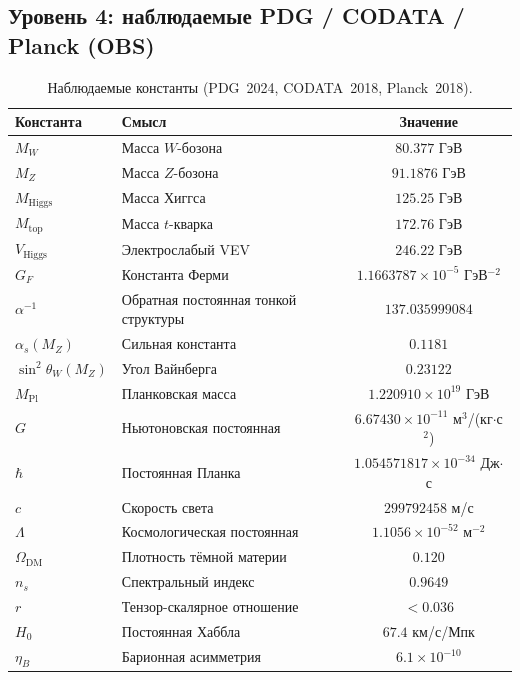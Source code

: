 \documentclass[11pt,a4paper]{article}
\theoremstyle{definition}
\begin{document}
\subsection{Уровень 4: наблюдаемые PDG / CODATA / Planck (OBS)}
\label{app:level-4-obs}

\begin{table}[ht]
\centering
\caption{Наблюдаемые константы (PDG~2024, CODATA~2018, Planck~2018).}
\label{tab:app-obs}
\begin{tabular}{llc}
\toprule
Константа & Смысл & Значение \\
\midrule
$M_W$ & Масса $W$-бозона & $80.377$ ГэВ \\
$M_Z$ & Масса $Z$-бозона & $91.1876$ ГэВ \\
$M_{\text{Higgs}}$ & Масса Хиггса & $125.25$ ГэВ \\
$M_{\text{top}}$ & Масса $t$-кварка & $172.76$ ГэВ \\
$V_{\text{Higgs}}$ & Электрослабый VEV & $246.22$ ГэВ \\
$G_F$ & Константа Ферми & $1.1663787 \times 10^{-5}$ ГэВ$^{-2}$ \\
$\alpha^{-1}$ & Обратная постоянная тонкой структуры & $137.035999084$ \\
$\alpha_s(M_Z)$ & Сильная константа & $0.1181$ \\
$\sin^2\theta_W(M_Z)$ & Угол Вайнберга & $0.23122$ \\
$M_{\text{Pl}}$ & Планковская масса & $1.220910 \times 10^{19}$ ГэВ \\
$G$ & Ньютоновская постоянная & $6.67430 \times 10^{-11}$ м$^3$/(кг$\cdot$с$^2$) \\
$\hbar$ & Постоянная Планка & $1.054571817 \times 10^{-34}$ Дж$\cdot$с \\
$c$ & Скорость света & $299792458$ м/с \\
$\Lambda$ & Космологическая постоянная & $1.1056 \times 10^{-52}$ м$^{-2}$ \\
$\Omega_{\text{DM}}$ & Плотность тёмной материи & $0.120$ \\
$n_s$ & Спектральный индекс & $0.9649$ \\
$r$ & Тензор-скалярное отношение & $< 0.036$ \\
$H_0$ & Постоянная Хаббла & $67.4$ км/с/Мпк \\
$\eta_B$ & Барионная асимметрия & $6.1 \times 10^{-10}$ \\
\bottomrule
\end{tabular}
\end{table}
\end{document}
